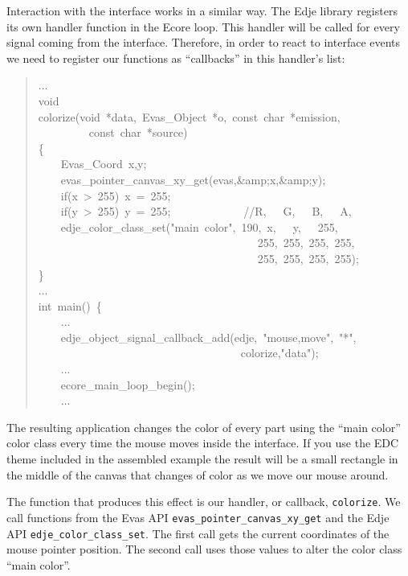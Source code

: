 \documentclass[12pt,a4paper,english]{book}
\begin{document}
Interaction with the interface works in a similar way. The Edje library
registers its own handler function in the Ecore loop. This handler will be
called for every signal coming from the interface. Therefore, in order to react
to interface events we need to register our functions as ``callbacks'' in this
handler's list:
\begin{quote}{\ttfamily \raggedright \noindent
...~\\
void~\\
colorize(void~*data,~Evas{\_}Object~*o,~const~char~*emission,~\\
~~~~~~~~~const~char~*source)~\\
{\{}~\\
~~~~Evas{\_}Coord~x,y;~\\
~~~~evas{\_}pointer{\_}canvas{\_}xy{\_}get(evas,{\&}amp;x,{\&}amp;y);~\\
~~~~if(x~>~255)~x~=~255;~\\
~~~~if(y~>~255)~y~=~255;~~~~~~~~~~~~~//R,~~~G,~~~B,~~~A,~\\
~~~~edje{\_}color{\_}class{\_}set("main~color",~190,~x,~~~y,~~~255,~\\
~~~~~~~~~~~~~~~~~~~~~~~~~~~~~~~~~~~~~~~255,~255,~255,~255,~\\
~~~~~~~~~~~~~~~~~~~~~~~~~~~~~~~~~~~~~~~255,~255,~255,~255);~\\
{\}}~\\
...~\\
int~main()~{\{}~\\
~~~~...~\\
~~~~edje{\_}object{\_}signal{\_}callback{\_}add(edje,~"mouse,move",~"*",~\\
~~~~~~~~~~~~~~~~~~~~~~~~~~~~~~~~~~~~colorize,"data");~\\
~~~~...~\\
~~~~ecore{\_}main{\_}loop{\_}begin();~\\
~~~~...
}\end{quote}

The resulting application changes the color of every part using the ``main
color'' color class every time the mouse moves inside the interface. If you use
the EDC theme included in the assembled example the result will be a small
rectangle in the middle of the canvas that changes of color as we move our
mouse around.

The function that produces this effect is our handler, or callback, \texttt{colorize}.
We call functions from the Evas API \texttt{evas{\_}pointer{\_}canvas{\_}xy{\_}get} and the Edje
API \texttt{edje{\_}color{\_}class{\_}set}. The first call gets the current coordinates of
the mouse pointer position. The second call uses those values to alter the
color class ``main color''.
\end{document}
